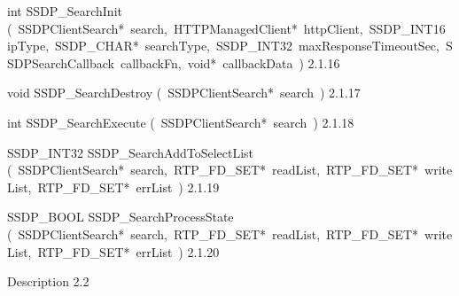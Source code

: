 \documentclass{article}
\begin{document}
\begin{cxxentry}
\begin{cxxentry}
\begin{cxxfunction}
\begin{cxxdoc}
\end{cxxdoc}
\end{cxxfunction}
\begin{cxxfunction}
{int}
        {SSDP\_SearchInit}
        {(\ SSDPClientSearch*\ search,\ HTTPManagedClient*\ httpClient,\ SSDP\_INT16\ ipType,\ SSDP\_CHAR*\ searchType,\ SSDP\_INT32\ maxResponseTimeoutSec,\ SSDPSearchCallback\ callbackFn,\ void*\ callbackData\ )}
        {}
        {2.1.16}
\end{cxxfunction}
\begin{cxxfunction}
{void}
        {SSDP\_SearchDestroy}
        {(\ SSDPClientSearch*\ search\ )}
        {}
        {2.1.17}
\end{cxxfunction}
\begin{cxxfunction}
{int}
        {SSDP\_SearchExecute}
        {(\ SSDPClientSearch*\ search\ )}
        {}
        {2.1.18}
\end{cxxfunction}
\begin{cxxfunction}
{SSDP\_INT32}
        {SSDP\_SearchAddToSelectList}
        {(\ SSDPClientSearch*\ search,\ RTP\_FD\_SET*\ readList,\ RTP\_FD\_SET*\ writeList,\ RTP\_FD\_SET*\ errList\ )}
        {}
        {2.1.19}
\end{cxxfunction}
\begin{cxxfunction}
{SSDP\_BOOL}
        {SSDP\_SearchProcessState}
        {(\ SSDPClientSearch*\ search,\ RTP\_FD\_SET*\ readList,\ RTP\_FD\_SET*\ writeList,\ RTP\_FD\_SET*\ errList\ )}
        {}
        {2.1.20}
\end{cxxfunction}
\end{cxxentry}
\begin{cxxentry}
{}
        {Description}
        {}
        {}
        {2.2}

\end{cxxentry}
\end{cxxentry}
\end{document}
